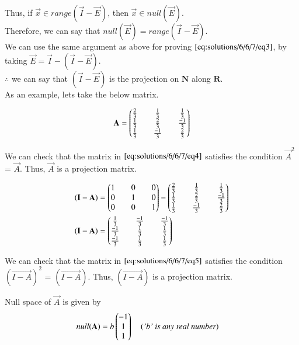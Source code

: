 	Thus, if $\vec{x} \in range(\Vec{I} - \Vec{E})$, then $\Vec{x} \in null(\Vec{E})$.\\
	
	Therefore, we can say that $null(\Vec{E}) = range(\Vec{I} - \Vec{E})$. \\
	
	We can use the same argument as above for proving $\eqref{eq:solutions/6/6/7/eq3}$, by taking $\Vec{E} = \Vec{I} - (\Vec{I} - \Vec{E})$.\\
	
	$\therefore$ we can say that $(\Vec{I} - \Vec{E})$ is the projection on $\mathbf{N}$ along $\mathbf{R}$.\\
	
	As an example, lets take the below matrix.
	
	\begin{align}\label{eq:solutions/6/6/7/eq4}
		\mathbf{A} = \begin{pmatrix}\frac{2}{3}&&\frac{1}{3}&&\frac{1}{3}\\
			\frac{1}{3}&&\frac{2}{3}&&\frac{-1}{3}\\
			\frac{1}{3}&&\frac{-1}{3}&&\frac{2}{3}\end{pmatrix}
	\end{align}
	
	We can check that the matrix in $\eqref{eq:solutions/6/6/7/eq4}$ satisfies the condition $\vec{A}^{2}$ = $\vec{A}$. Thus, $\vec{A}$ is a projection matrix.
	
	\begin{align}\label{eq:solutions/6/6/7/eq5}
		(\mathbf{I-A}) &= \begin{pmatrix}1&&0&&0\\
			0&&1&&0\\
			0&&0&&1\end{pmatrix} - \begin{pmatrix}\frac{2}{3}&&\frac{1}{3}&&\frac{1}{3}\\
			\frac{1}{3}&&\frac{2}{3}&&\frac{-1}{3}\\
			\frac{1}{3}&&\frac{-1}{3}&&\frac{2}{3}\end{pmatrix} \nonumber\\
		(\mathbf{I-A}) &= \begin{pmatrix}\frac{1}{3}&&\frac{-1}{3}&&\frac{-1}{3}\\
			\frac{-1}{3}&&\frac{1}{3}&&\frac{1}{3}\\
			\frac{-1}{3}&&\frac{1}{3}&&\frac{1}{3}\end{pmatrix}
	\end{align} 
	
	We can check that the matrix in $\eqref{eq:solutions/6/6/7/eq5}$ satisfies the condition $(\vec{I-A})^{2}$ = $(\vec{I-A})$. Thus, $(\vec{I-A})$ is a projection matrix.
	
	Null space of $\vec{A}$ is given by
	\begin{align}\label{eq:solutions/6/6/7/eq6}
		null(\Vec{A}) &= b \myvec{-1\\1\\1} \quad ( \textit{'b' is any real number})
	\end{align}
	
